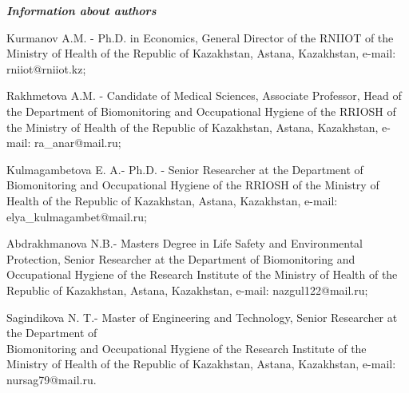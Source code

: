\emph{{\bfseries Information about authors}}

\begin{noparindent}
Kurmanov A.M. - Ph.D. in Economics, General Director of the RNIIOT of
the Ministry of Health of the Republic of Kazakhstan, Astana,
Kazakhstan, e-mail: rniiot@rniiot.kz;

Rakhmetova A.M. - Candidate of Medical Sciences, Associate Professor,
Head of the Department of Biomonitoring and Occupational Hygiene of the
RRIOSH of the Ministry of Health of the Republic of Kazakhstan, Astana,
Kazakhstan, e-mail: ra\_anar@mail.ru;

Kulmagambetova E. A.- Ph.D. - Senior Researcher at the Department of
Biomonitoring and Occupational Hygiene of the RRIOSH of the Ministry of
Health of the Republic of Kazakhstan, Astana, Kazakhstan, e-mail:
elya\_kulmagambet@mail.ru;

Abdrakhmanova N.B.- Master\textquotesingle s Degree in Life Safety and
Environmental Protection, Senior Researcher at the Department of
Biomonitoring and Occupational Hygiene of the Research Institute of the
Ministry of Health of the Republic of Kazakhstan, Astana, Kazakhstan,
e-mail: nazgul122@mail.ru;

Sagindikova N. T.- Master of Engineering and Technology, Senior
Researcher at the Department of \\Biomonitoring and Occupational Hygiene
of the Research Institute of the Ministry of Health of the Republic of
Kazakhstan, Astana, Kazakhstan, e-mail: nursag79@mail.ru.
\end{noparindent}
